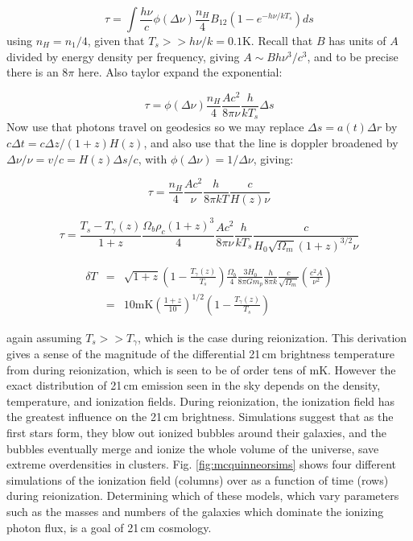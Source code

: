 \begin{equation}
\tau=\int\frac{h\nu}{c}\phi(\Delta\nu)\frac{n_H}{4}B_{12}(1-e^{-h\nu/kT_s})ds
\end{equation}
using $n_H=n_1/4$, given that $T_s>>h\nu/k=0.1$K. Recall that $B$ has units of $A$ divided by energy density per frequency, giving $A\sim Bh\nu^3/c^3$, and to be precise there is an $8\pi$ here. Also taylor expand the exponential:

\begin{equation}
\tau=\phi(\Delta\nu)\frac{n_H}{4}\frac{Ac^2}{8\pi\nu}\frac{h}{kT_s}\Delta s
\end{equation}
Now use that photons travel on geodesics so we may replace $\Delta s=a(t)\Delta r$ by $c\Delta t=c\Delta z/(1+z)H(z)$, and also use that the line is doppler broadened by $\Delta\nu/\nu=v/c=H(z)\Delta s/c$, with $\phi(\Delta\nu)=1/\Delta \nu$, giving:

\begin{equation}
\tau=\frac{n_H}{4}\frac{Ac^2}{\nu}\frac{h}{8\pi kT}\frac{c}{H(z)\nu}
\end{equation}

\begin{equation}
\tau=\frac{T_s-T_\gamma(z)}{1+z}\frac{\Omega_b\rho_c(1+z)^3}{4}\frac{Ac^2}{8\pi\nu}\frac{h}{kT_s}\frac{c}{H_0\sqrt{\Omega_m}(1+z)^{3/2}\nu}
\end{equation}

\begin{eqnarray}
\delta T&=&\sqrt{1+z}\left(1-\frac{T_\gamma(z)}{T_s}\right)\frac{\Omega_b}{4}\frac{3H_0}{8\pi Gm_p}\frac{h}{8\pi k}\frac{c}  {\sqrt{\Omega_m}}\left(\frac{c^2A}{\nu^2}\right)\\
&=&10\text{mK}\left(\frac{1+z}{10}\right)^{1/2}\left(1-\frac{T_\gamma(z)}{T_s}\right) 
\end{eqnarray}

again assuming $T_s>>T_\gamma$, which is the case during reionization. This derivation gives a sense of the magnitude of the differential 21\,cm brightness temperature from during reionization, which is seen to be of order tens of mK. However the exact distribution of 21\,cm emission seen in the sky depends on the density, temperature, and ionization fields. During reionization, the ionization field has the greatest influence on the 21\,cm brightness. Simulations suggest that as the first stars form, they blow out ionized bubbles around their galaxies, and the bubbles eventually merge and ionize the whole volume of the universe, save extreme overdensities in clusters. Fig. \ref{fig:mcquinneorsims} shows four different simulations of the ionization field (columns) over as a function of time (rows) during reionization. Determining which of these models, which vary parameters such as the masses and numbers of the galaxies which dominate the ionizing photon flux, is a goal of 21\,cm cosmology.


